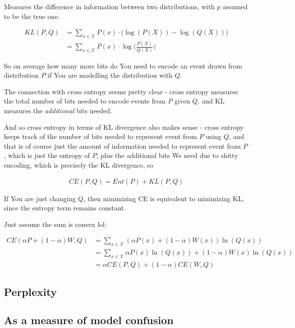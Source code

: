 \documentclass{article}
\begin{document}
		Measures the difference in information between two distributions, with $p$ assumed to be the true one.
		
		\begin{align}
			KL(P, Q) &= \sum_{x\in\mathcal{X}} P(x)\cdot\big(\log(P(X)) - \log(Q(X)) \big)\\
			&= \sum_{x\in\mathcal{X}} P(x)\cdot\log\bigg(\frac{P(X)}{Q(X)}\bigg)
		\end{align}
		
		So on average how many more bits do You need to encode an event drawn from distribution $P$ if You are modelling the distribution with $Q$.
		
		The connection with cross entropy seems pretty clear - cross entropy measures the total number of bits needed to encode events from $P$ given $Q$, and KL measures the \textit{additional} bits needed.
		
		And so cross entropy in terms of KL divergence also makes sense - cross entropy keeps track of the number of bits needed to represent event from $P$ using $Q$, and that is of course just the amount of information needed to represent event from $P$, which is just the entropy of $P$, plus the additional bits We need due to shitty encoding, which is precisely the KL divergence, so
		
		\begin{align}
			CE(P, Q) = Ent(P) + KL(P, Q)
		\end{align}
		
		If You are just changing $Q$, then minimizing CE is equivalent to minimizing KL, since the entropy term remains constant. 
		
		Just assume the sum is convex lol:
				
		\begin{align}
			CE(\alpha P+(1-\alpha)W, Q) &= \sum_{x\in\mathcal{X}} (\alpha P(x)+(1-\alpha)W(x))\ln(Q(x))\\
			&= \sum_{x\in\mathcal{X}} \alpha P(x)\ln(Q(x)) +(1-\alpha)W(x)\ln(Q(x))\\
			&= \alpha CE(P, Q) + (1-\alpha)CE(W, Q)
		\end{align}
		
	\subsection{Perplexity}
	
		\subsection{As a measure of model confusion}
		
\end{document}
